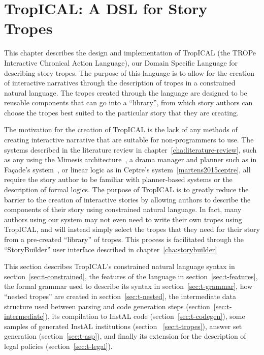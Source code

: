 
\chapter{TropICAL: A DSL for Story Tropes}
\label{cha:tropical}

This chapter describes the design and implementation of TropICAL (the TROPe
Interactive Chronical Action Language), our Domain Specific Language for
describing story tropes. The purpose of this language is to allow for the
creation of interactive narratives through the description of tropes in a
constrained natural language. The tropes created through the language are
designed to be reusable components that can go into a ``library'', from which
story authors can choose the tropes best suited to the particular story that they
are creating.

The motivation for the creation of TropICAL is the lack of any methods of
creating interactive narrative that are suitable for non-programmers to use. The
systems described in the literature review in
chapter~\ref{cha:literature-review}, such as any using the Mimesis
architecture~\cite{young2004architecture}, a drama manager and planner such as
in Fa\c{c}ade's system~\cite{mateas2003faccade}, or linear logic as in Ceptre's
system~\ref{martens2015ceptre}, all require the story author to be familiar with
planner-based systems or the description of formal logics. The purpose of
TropICAL is to greatly reduce the barrier to the creation of interactive stories
by allowing authors to describe the components of their story using constrained
natural language. In fact, many authors using our system may not even need to
write their own tropes using TropICAL, and will instead simply select the tropes
that they need for their story from a pre-created ``library'' of tropes. This
process is facilitated through the ``StoryBuilder'' user interface described in
chapter~\ref{cha:storybuilder}

This section describes TropICAL's constrained natural
language syntax in section~\ref{sec:t-constrained}, the features of the language in section~\ref{sec:t-features}, 
the formal grammar used to
describe its syntax in section~\ref{sec:t-grammar}, how ``nested
tropes'' are created in section~\ref{sec:t-nested}, the intermediate data structure used between parsing and
code generation steps (section~\ref{sec:t-intermediate}), its compilation
to InstAL code (section~\ref{sec:t-codegen}), some samples of generated InstAL
institutions (section ~\ref{sec:t-tropes}), answer set
generation (section~\ref{sec:t-asp}), and finally its extension for the description of legal policies
(section~\ref{sec:t-legal}).


